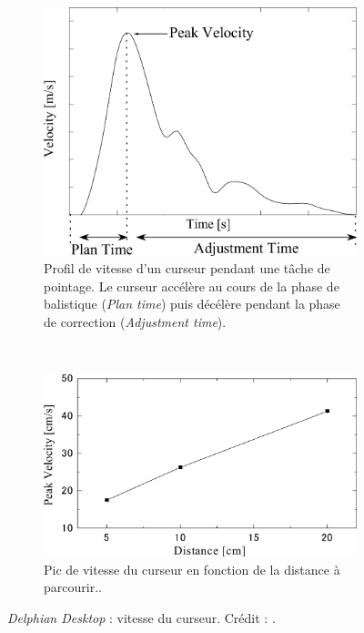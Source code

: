 	\begin{figure}[!htb]
		\begin{subfigure}[t]{0.49\textwidth}
			\centering
			\includegraphics[width=\textwidth]{figures/ch2/delphianPeak}
			\caption{Profil de vitesse d'un curseur pendant une tâche de pointage. Le curseur accélère au cours de la phase de balistique (\emph{Plan time}) puis décélère pendant la phase de correction (\emph{Adjustment time}).}
			\label{fig:delphianPeak}
		\end{subfigure}
		~
		\begin{subfigure}[t]{0.49\textwidth}
			\centering
			\includegraphics[width=\textwidth]{figures/ch2/delphianSpeedDist}
			\caption{Pic de vitesse du curseur en fonction de la distance à parcourir..}
			\label{fig:delphianSpeedDist}
		\end{subfigure}
		\caption[\emph{Delphian Desktop} : vitesse du curseur]{\emph{Delphian Desktop} : vitesse du curseur. Crédit : \cite{asano2005predictive}.}
		\label{fig:plop}
	\end{figure}
	
